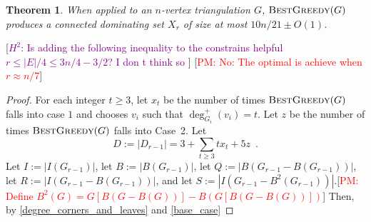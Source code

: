\documentclass[12pt]{article}
\newtheorem{thm}{Theorem}
\theoremstyle{definition}
\newcommand{\pat}[1]{[\textcolor{red}{PM: #1}]}
\newcommand{\hussein}[1]{[\textcolor{purple}{$H^2$: #1}]}
\begin{document}
\begin{thm}\label{best_greedy}
  When applied to an $n$-vertex triangulation $G$,  $\textsc{BestGreedy}(G)$ produces a connected dominating set $X_r$ of size at most $10n/21\pm O(1)$.
\end{thm}
\hussein{Is adding the following inequality to the constrains helpful  $r \leq |E|/4 \leq 3n/4 - 3/2$? I don t think so  } \pat{No: The optimal is achieve when $r\approx n/7$}
\begin{proof}
  For each integer $t\ge 3$, let $x_t$ be the number of times $\textsc{BestGreedy}(G)$ falls into case $1$ and chooses $v_i$ such that $\deg^+_{G_i}(v_i)=t$.  Let $z$ be the number of times $\textsc{BestGreedy}(G)$ falls into Case~2.  Let
  \[
     D:=|D_{r-1}| = 3 + \sum_{t\ge 3}tx_t + 5z \enspace .
  \]
  Let $I:=|I(G_{r-1})|$, let $B:=|B(G_{r-1})|$, let $Q:=|B(G_{r-1}-B(G_{r-1}))|$, let $R:=|I(G_{r-1}-B(G_{r-1}))|$, and let $S:=|I(G_{r-1}-B^2(G_{r-1}))|$.\pat{Define $B^2(G)=G[B(G-B(G))]-B(G[B(G-B(G))])$}  Then, by \cref{degree_corners_and_leaves} and \cref{base_case}


\end{proof}
\end{document}
